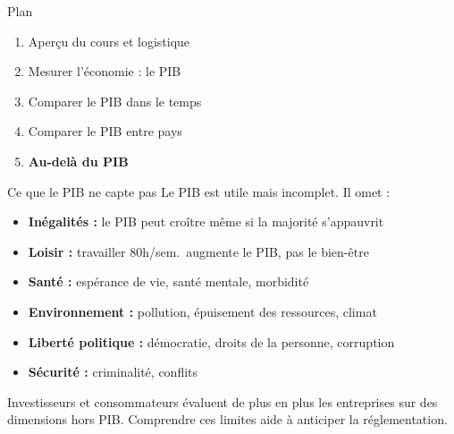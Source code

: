 \documentclass[aspectratio=169]{beamer}
\begin{document}
\begin{frame}{Plan}
   \begin{enumerate}
      \setlength\itemsep{0.35cm}
      \item {\color{gray!50}Aper\c{c}u du cours et logistique}
      \item {\color{gray!50}Mesurer l'\'economie : le PIB}
      \item {\color{gray!50}Comparer le PIB dans le temps}
      \item {\color{gray!50}Comparer le PIB entre pays}
      \item \textbf{Au-del\`a du PIB}
   \end{enumerate}
\end{frame}


\begin{frame}[t]{Ce que le PIB ne capte pas}
   \small
   Le PIB est utile mais incomplet. Il omet :
   \vspace{0.1cm}
   \begin{itemize}
      \setlength\itemsep{0.05cm}
      \item \textbf{In\'egalit\'es :} le PIB peut cro\^itre m\^eme si la majorit\'e s'appauvrit
      \item \textbf{Loisir :} travailler 80h/sem.\ augmente le PIB, pas le bien-\^etre
      \item \textbf{Sant\'e :} esp\'erance de vie, sant\'e mentale, morbidit\'e
      \item \textbf{Environnement :} pollution, \'epuisement des ressources, climat
      \item \textbf{Libert\'e politique :} d\'emocratie, droits de la personne, corruption
      \item \textbf{S\'ecurit\'e :} criminalit\'e, conflits
   \end{itemize}
   \vspace{0.05cm}
   \begin{bizimplication}
      \footnotesize Investisseurs et consommateurs \'evaluent de plus en plus les entreprises sur des dimensions hors PIB. Comprendre ces limites aide \`a anticiper la r\'eglementation.
   \end{bizimplication}
\end{frame}
\end{document}
